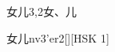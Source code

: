 \begin{entry}{女儿}{3,2}{⼥、⼉}
  \begin{phonetics}{女儿}{nv3'er2}[][HSK 1]
  \end{phonetics}
\end{entry}
